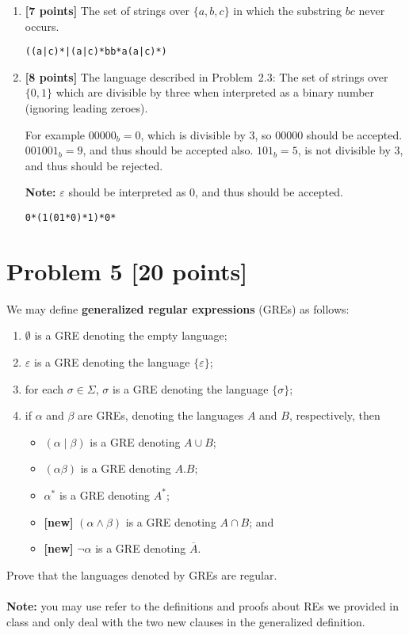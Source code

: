 \documentclass[11pt]{article}
\begin{document}
\begin{enumerate}

\item {\bf [7 points]} The set of strings over $\{a,b,c\}$ in which the
substring $bc$ never occurs.
\begin{verbatim}
((a|c)*|(a|c)*bb*a(a|c)*)
\end{verbatim}

\item {\bf [8 points]} The language described in Problem~2.3:
The set of strings over $\{0, 1\}$ which are divisible by three
 when interpreted as a binary number (ignoring leading zeroes).

For example $00000_b = 0$, which is divisible by 3, so $00000$ should be accepted.
$001001_b = 9$, and thus should be accepted also.
$101_b = 5$, is not divisible by 3, and thus should be rejected.

{\bf Note:} $\varepsilon$ should be interpreted as 0, and thus should be accepted.
\begin{verbatim}
0*(1(01*0)*1)*0*
\end{verbatim}
\end{enumerate}

\pagebreak

\section*{Problem 5 [20 points]}

We may define \textbf{generalized regular expressions} (GREs) as follows:
\begin{enumerate}
\item $\emptyset$ is a GRE denoting the empty language;
\item $\varepsilon$ is a GRE denoting the language $\{ \varepsilon \}$;
\item for each $\sigma \in \Sigma$, $\sigma$ is a GRE denoting the language $\{ \sigma \}$;
\item if $\alpha$ and $\beta$ are GREs, denoting the languages $A$ and $B$, respectively, then
\begin{itemize}
\item $(\alpha \mid \beta)$ is a GRE denoting $A \cup B$;
\item $(\alpha \beta)$ is a GRE denoting $A.B$;
\item $\alpha^*$ is a GRE denoting $A^*$;
\item \textbf{[new]} $(\alpha \wedge \beta)$ is a GRE denoting $A \cap B$; and
\item \textbf{[new]} $\neg \alpha$ is a GRE denoting $\overline{A}$.
\end{itemize}
\end{enumerate}
Prove that the languages denoted by GREs are regular.
\\
\\
\noindent \textbf{Note:} you may use refer to the definitions and proofs about  REs we provided in class and only deal with the two new clauses in the generalized definition.
\end{document}
